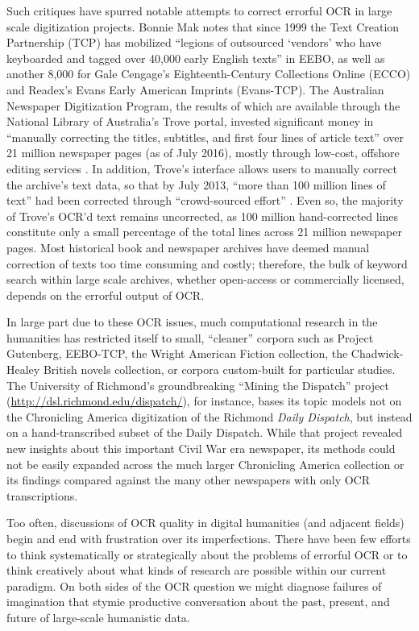 \documentclass[twoside,11pt]{report}
\begin{document}
Such critiques have spurred notable attempts to correct errorful OCR in large scale digitization projects. Bonnie Mak \citeyearpar{mak14:_archaeol_digit} notes that since 1999 the Text Creation Partnership (TCP) has mobilized ``legions of outsourced `vendors' who have keyboarded and tagged over 40,000 early English texts'' in EEBO, as well as another 8,000 for Gale Cengage's Eighteenth-Century Collections Online (ECCO) and Readex's Evans Early American Imprints (Evans-TCP).  The Australian Newspaper Digitization Program, the results of which are available through the National Library of Australia's Trove portal, invested significant money in ``manually correcting the titles, subtitles, and first four lines of article text'' over 21 million newspaper pages (as of July 2016), mostly through low-cost, offshore editing services \citep{bode16:_thous_titles_author}. In addition, Trove's interface allows users to manually correct the archive's text data, so that by July 2013, ``more than 100 million lines of text'' had been corrected through ``crowd-sourced effort'' \citep{ayres13:_singin_supper}.  Even so, the majority of Trove's OCR'd text remains uncorrected, as 100 million hand-corrected lines constitute only a small percentage of the total lines across 21 million newspaper pages. Most historical book and newspaper archives have deemed manual correction of texts too time consuming and costly; therefore, the bulk of keyword search within large scale archives, whether open-access or commercially licensed, depends on the errorful output of OCR.

In large part due to these OCR issues, much computational research in the humanities has restricted itself to small, ``cleaner'' corpora such as Project Gutenberg, EEBO-TCP, the Wright American Fiction collection, the Chadwick-Healey British novels collection, or corpora custom-built for particular studies. The University of Richmond's groundbreaking ``Mining the Dispatch'' project (\url{http://dsl.richmond.edu/dispatch/}), for instance, bases its topic models not on the Chronicling America digitization of the Richmond \emph{Daily Dispatch}, but instead on a hand-transcribed subset of the Daily Dispatch. While that project revealed new insights about this important Civil War era newspaper, its methods could not be easily expanded across the much larger Chronicling America collection or its findings compared against the many other newspapers with only OCR transcriptions.

Too often, discussions of OCR quality in digital humanities (and adjacent fields) begin and end with frustration over its imperfections. There have been few efforts to think systematically or strategically about the problems of errorful OCR or to think creatively about what kinds of research are possible within our current paradigm. On both sides of the OCR question we might diagnose failures of imagination that stymie productive conversation about the past, present, and future of large-scale humanistic data.
\end{document}
